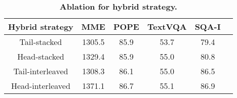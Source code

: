 \begin{table}[t!]
    \centering
    \small
    \begin{tabular}{c | c c c c c}
    \toprule
    Hybrid strategy &MME &  POPE & TextVQA & SQA-I\\
    \midrule
    Tail-stacked & 1305.5 & 85.9 & 53.7 & 79.4 \\
    Head-stacked & 1329.4 & 85.9 & 55.0 & 80.8  \\
    Tail-interleaved & 1308.3 & 86.1 & 55.0 & 86.5 \\
    \rowcolor{yellow!15}
    Head-interleaved & 1371.1 & 86.7 & 55.1 & 86.9 \\
    \bottomrule
    \end{tabular}
    \vspace{-1em}
    \caption{\textbf{Ablation for hybrid strategy.}}
    \vspace{-1em}
    \label{tab:hybrid_strategy}
 \end{table}

